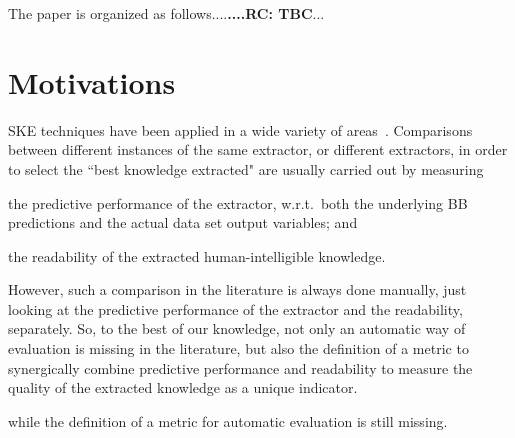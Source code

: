 \documentclass{article}
\newenvironment{inlinelist}{\begin{enumerate*}[label=\emph{(\roman{*})}]}{\end{enumerate*}}
\begin{document}
The paper is organized as follows....\textbf{....RC: TBC}...

\section{Motivations}\label{sec:motivation}

SKE techniques have been applied in a wide variety of areas~\cite{steiner2006using,hayashi2000comparison,sabbatini22LPFSKE}.
%
Comparisons between different instances of the same extractor, or different extractors, in order to select the ``best knowledge extracted" are usually carried out by measuring
%
\begin{inlinelist}
	\item the predictive performance of the extractor, w.r.t.\ both the underlying BB predictions and the actual data set output variables; and
	\item the readability of the extracted human-intelligible knowledge.
\end{inlinelist}
%
However, such a comparison in the literature is always done manually, just looking at the predictive performance of the extractor and the readability, separately.
So, to the best of our knowledge, not only an automatic way of evaluation is missing in the literature, but also the definition of a metric to synergically combine predictive performance and readability to measure the quality of the extracted knowledge as a unique indicator.

 while the definition of a metric for automatic evaluation is still missing. 
\end{document}
